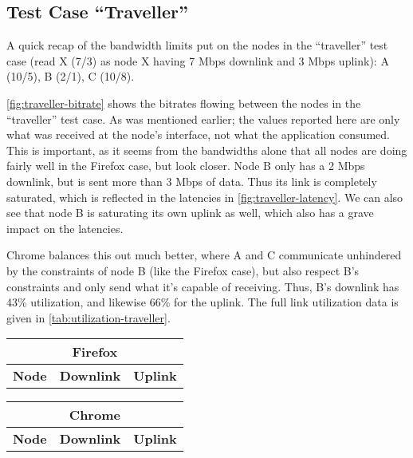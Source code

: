 \subsection{Test Case ``Traveller''}

A quick recap of the bandwidth limits put on the nodes in the ``traveller'' test case (read X (7/3) as node X having 7 Mbps downlink and 3 Mbps uplink): A (10/5), B (2/1), C (10/8).

\autoref{fig:traveller-bitrate} shows the bitrates flowing between the nodes in the ``traveller'' test case. As was mentioned earlier; the values reported here are only what was received at the node's interface, not what the application consumed. This is important, as it seems from the bandwidths alone that all nodes are doing fairly well in the Firefox case, but look closer. Node B only has a 2 Mbps downlink, but is sent more than 3 Mbps of data. Thus its link is completely saturated, which is reflected in the latencies in \autoref{fig:traveller-latency}. We can also see that node B is saturating its own uplink as well, which also has a grave impact on the latencies.

Chrome balances this out much better, where A and C communicate unhindered by the constraints of node B (like the Firefox case), but also respect B's constraints and only send what it's capable of receiving. Thus, B's downlink has 43\% utilization, and likewise 66\% for the uplink. The full link utilization data is given in \autoref{tab:utilization-traveller}.

\begin{center}
    \label{tab:utilization-traveller}
    \begin{tabular}{| l | l | l |}
    \multicolumn{3}{c}{\textbf{Firefox}} \\ \hline
    \textbf{Node} & \textbf{Downlink} & \textbf{Uplink} \\ \hline
    
    \hline
    \end{tabular}
    \hfill
    \begin{tabular}{| l | l | l |}
    \multicolumn{3}{c}{\textbf{Chrome}} \\ \hline
    \textbf{Node} & \textbf{Downlink} & \textbf{Uplink} \\ \hline
    
    \hline
    \end{tabular}
\end{center}


